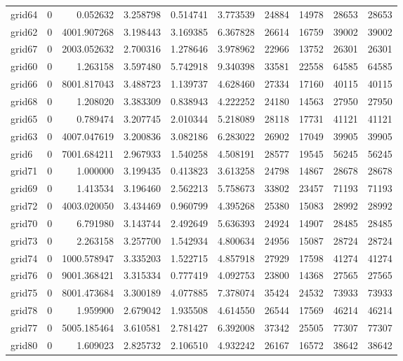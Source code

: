 \begin{longtable}{|l|r|r|r|r|r|r|r|r|r|}
grid64 & 0 & 0.052632 & 3.258798 & 0.514741 & 3.773539 & 24884 & 14978 & 28653 & 28653 \\
grid62 & 0 & 4001.907268 & 3.198443 & 3.169385 & 6.367828 & 26614 & 16759 & 39002 & 39002 \\
grid67 & 0 & 2003.052632 & 2.700316 & 1.278646 & 3.978962 & 22966 & 13752 & 26301 & 26301 \\
grid60 & 0 & 1.263158 & 3.597480 & 5.742918 & 9.340398 & 33581 & 22558 & 64585 & 64585 \\
grid66 & 0 & 8001.817043 & 3.488723 & 1.139737 & 4.628460 & 27334 & 17160 & 40115 & 40115 \\
grid68 & 0 & 1.208020 & 3.383309 & 0.838943 & 4.222252 & 24180 & 14563 & 27950 & 27950 \\
grid65 & 0 & 0.789474 & 3.207745 & 2.010344 & 5.218089 & 28118 & 17731 & 41121 & 41121 \\
grid63 & 0 & 4007.047619 & 3.200836 & 3.082186 & 6.283022 & 26902 & 17049 & 39905 & 39905 \\
grid6 & 0 & 7001.684211 & 2.967933 & 1.540258 & 4.508191 & 28577 & 19545 & 56245 & 56245 \\
grid71 & 0 & 1.000000 & 3.199435 & 0.413823 & 3.613258 & 24798 & 14867 & 28678 & 28678 \\
grid69 & 0 & 1.413534 & 3.196460 & 2.562213 & 5.758673 & 33802 & 23457 & 71193 & 71193 \\
grid72 & 0 & 4003.020050 & 3.434469 & 0.960799 & 4.395268 & 25380 & 15083 & 28992 & 28992 \\
grid70 & 0 & 6.791980 & 3.143744 & 2.492649 & 5.636393 & 24924 & 14907 & 28485 & 28485 \\
grid73 & 0 & 2.263158 & 3.257700 & 1.542934 & 4.800634 & 24956 & 15087 & 28724 & 28724 \\
grid74 & 0 & 1000.578947 & 3.335203 & 1.522715 & 4.857918 & 27929 & 17598 & 41274 & 41274 \\
grid76 & 0 & 9001.368421 & 3.315334 & 0.777419 & 4.092753 & 23800 & 14368 & 27565 & 27565 \\
grid75 & 0 & 8001.473684 & 3.300189 & 4.077885 & 7.378074 & 35424 & 24532 & 73933 & 73933 \\
grid78 & 0 & 1.959900 & 2.679042 & 1.935508 & 4.614550 & 26544 & 17569 & 46214 & 46214 \\
grid77 & 0 & 5005.185464 & 3.610581 & 2.781427 & 6.392008 & 37342 & 25505 & 77307 & 77307 \\
grid80 & 0 & 1.609023 & 2.825732 & 2.106510 & 4.932242 & 26167 & 16572 & 38642 & 38642 \\

\end{longtable}
